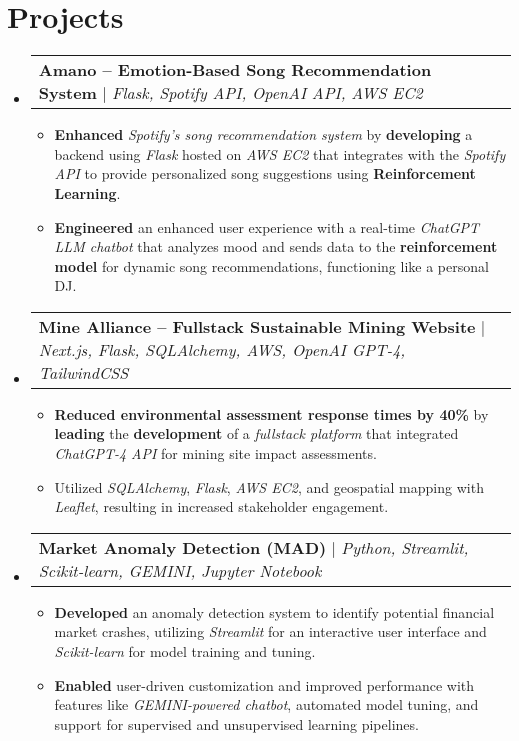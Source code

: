 \documentclass[letterpaper,10pt]{article}
\makeatletter
\newcommand{\resumeItem}[1]{
  \item\small{
    {#1 \vspace{-2pt}}
  }
}
\newcommand{\resumeProjectHeading}[2]{
    \item
    \begin{tabular*}{0.97\textwidth}{l@{\extracolsep{\fill}}r}
      \small#1 & #2 \\
    \end{tabular*}\vspace{-2pt}
}
\newcommand{\resumeSubHeadingListStart}{\begin{itemize}[leftmargin=0.15in, label={}]}
\newcommand{\resumeSubHeadingListEnd}{\end{itemize}}
\newcommand{\resumeItemListStart}{\begin{itemize}}
\newcommand{\resumeItemListEnd}{\end{itemize}\vspace{-5pt}}
\makeatother
\begin{document}
\section{Projects}
    \vspace{-4pt}
    \resumeSubHeadingListStart
      \resumeProjectHeading
          {\textbf{Amano – Emotion-Based Song Recommendation System} $|$ \emph{Flask, Spotify API, OpenAI API, AWS EC2}}{}
      \vspace{-4pt} %
          \resumeItemListStart
            \resumeItem{\textbf{Enhanced} \emph{Spotify's song recommendation system} by \textbf{developing} a backend using \emph{Flask} hosted on \emph{AWS EC2} that integrates with the \emph{Spotify API} to provide personalized song suggestions using \textbf{Reinforcement Learning}.}
            \resumeItem{\textbf{Engineered} an enhanced user experience with a real-time \emph{ChatGPT LLM chatbot} that analyzes mood and sends data to the \textbf{reinforcement model} for dynamic song recommendations, functioning like a personal DJ.}
          \resumeItemListEnd

      \resumeProjectHeading
          {\textbf{Mine Alliance – Fullstack Sustainable Mining Website} $|$ \emph{Next.js, Flask, SQLAlchemy, AWS, OpenAI GPT-4, TailwindCSS}}{}
      \vspace{-4pt}
          \resumeItemListStart
            \resumeItem{\textbf{Reduced environmental assessment response times by 40\%} by \textbf{leading} the \textbf{development} of a \emph{fullstack platform} that integrated \emph{ChatGPT-4 API} for mining site impact assessments.}
            \resumeItem{Utilized \emph{SQLAlchemy}, \emph{Flask}, \emph{AWS EC2}, and geospatial mapping with \emph{Leaflet}, resulting in increased stakeholder engagement.}
          \resumeItemListEnd

      \resumeProjectHeading
          {\textbf{Market Anomaly Detection (MAD)} $|$ \emph{Python, Streamlit, Scikit-learn, GEMINI, Jupyter Notebook}}{}
      \vspace{-4pt}
          \resumeItemListStart
            \resumeItem{\textbf{Developed} an anomaly detection system to identify potential financial market crashes, utilizing \emph{Streamlit} for an interactive user interface and \emph{Scikit-learn} for model training and tuning.}
            \resumeItem{\textbf{Enabled} user-driven customization and improved performance with features like \emph{GEMINI-powered chatbot}, automated model tuning, and support for supervised and unsupervised learning pipelines.}
          \resumeItemListEnd
    \resumeSubHeadingListEnd
\end{document}
